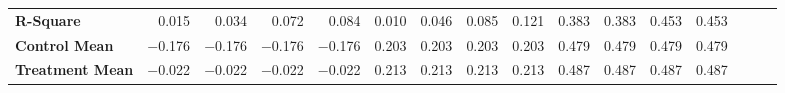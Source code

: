 \begin{tabular}{@{\extracolsep{5pt}}lrrrrrrrrrrrrrrr}
{\bf R-Square} & 0.015\phantom{***} & 0.034\phantom{***} & 0.072\phantom{***} & 0.084\phantom{***} & 0.010\phantom{***} & 0.046\phantom{***} & 0.085\phantom{***} & 0.121\phantom{***} & 0.383\phantom{***} & 0.383\phantom{***} & 0.453\phantom{***} & 0.453\phantom{***} \\
{\bf Control Mean} & $-$0.176\phantom{***} & $-$0.176\phantom{***} & $-$0.176\phantom{***} & $-$0.176\phantom{***} & 0.203\phantom{***} & 0.203\phantom{***} & 0.203\phantom{***} & 0.203\phantom{***} & 0.479\phantom{***} & 0.479\phantom{***} & 0.479\phantom{***} & 0.479\phantom{***} \\
{\bf Treatment Mean} & $-$0.022\phantom{***} & $-$0.022\phantom{***} & $-$0.022\phantom{***} & $-$0.022\phantom{***} & 0.213\phantom{***} & 0.213\phantom{***} & 0.213\phantom{***} & 0.213\phantom{***} & 0.487\phantom{***} & 0.487\phantom{***} & 0.487\phantom{***} & 0.487\phantom{***} \\
\hline
\end{tabular}
